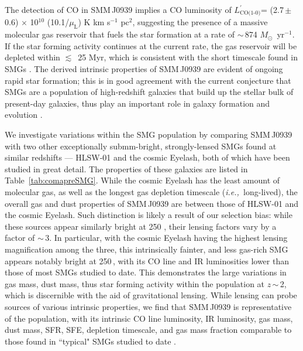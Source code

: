 \documentclass[twocolumn,apj,numberedappendix]{emulateapj}
\newcommand{\Msun}{\mbox{$M_{\odot}$}}
\newcommand{\Lp}{\mbox{$L^{\prime}_\textrm{CO(1-0)}$}}
\newcommand{\LpU}{\mbox{K\,\,km\,\,s$^{-1}$\,\,pc$^2$}}
\newcommand{\eg}{{\sl e.g.,~}}
\newcommand{\ie}{{\sl i.e.,~}}
\newcommand{\pmOne}{\mbox{$^{-1}$}}
\begin{document}
The detection of CO in SMM\,J0939
implies a CO luminosity of \Lp = (2.7\,$\pm$\,0.6) $\times$ 10$^{10}$ (10.1/$\mu_\textrm{L}$) \LpU, suggesting the presence of a massive
molecular gas reservoir that fuels the star formation at a rate of $\sim$\,874 \Msun~yr\pmOne. If the star forming activity continues at the current rate, the gas reservoir will be depleted within $\lesssim$~25 Myr,
which is consistent with the short timescale found in SMGs \citep{Greve05a}. The derived intrinsic properties of SMM\,J0939 are evident of ongoing rapid star formation; this is in good agreement with the current conjecture that SMGs are a %
population of high-redshift galaxies that build up the stellar bulk of present-day galaxies, thus play an important role
in galaxy formation and evolution \citep[\eg ][]{Dickinson03a}.

We investigate variations within the SMG population by comparing SMM\,J0939 with two other exceptionally submm-bright,
strongly-lensed SMGs
found at similar redshifts --- HLSW-01 and the cosmic Eyelash, both of which have been studied in great detail. The properties
of these galaxies are listed in Table~\ref{tab:comapreSMG}. While the cosmic Eyelash has the least amount of molecular gas, as well as
the
longest gas depletion timescale (\ie long-lived), the overall gas and dust properties of SMM\,J0939 are between those of HLSW-01 and the
cosmic
Eyelash. Such distinction is likely a result of our selection bias: while these sources appear similarly bright at 250 \micron, their lensing factors
vary by a factor of $\sim$\,3. In particular, with the cosmic Eyelash having the highest lensing magnification among the
three, this
intrinsically fainter, and less gas-rich SMG appears notably bright
at 250\,\micron, with its CO line and IR luminosities lower than those of most SMGs studied to date.
This demonstrates
the large variations in gas mass, dust mass, thus star forming activity within the population at $z$\,$\sim$\,2, which is discernible with the aid of gravitational lensing.
While lensing can probe sources
of various intrinsic properties, we find that SMM\,J0939 is representative of the population, with its intrinsic CO line luminosity, IR luminosity, gas mass,
dust mass, SFR, SFE, depletion timescale, and gas mass fraction comparable to those found in ``typical" SMGs studied to date
\citep[\eg ][]{Greve05a,Tacconi10a}.
\end{document}
